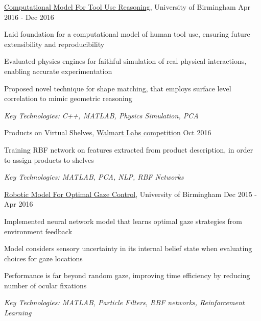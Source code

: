 \documentclass[11pt,article,oneside]{memoir}
\newenvironment{itemize*}{%
  \renewcommand\labelitemi{\textbullet}
  \footnotesize
  \begin{itemize}%
    \setlength{\itemsep}{0pt}}%
  {\end{itemize}
}
\begin{document}
\normalsize
\medskip
\ind \href{https://github.com/iceiony/4ConstraintsTheory/}{Computational Model For Tool Use Reasoning}, University of Birmingham \hfill Apr 2016 - Dec 2016
\begin{itemize*}
  \item Laid foundation for a computational model of human tool use, ensuring future extensibility and reproducibility 
  \item Evaluated physics engines for faithful simulation of real physical interactions, enabling accurate experimentation 
  \item Proposed novel technique for shape matching, that employs surface level correlation to mimic geometric reasoning
\end{itemize*}
\ind \hspace{0.35in} \footnotesize \emph{Key Technologies: C++, MATLAB, Physics Simulation, PCA}

\normalsize
\medskip
\ind Products on Virtual Shelves, \href{https://www.hackerrank.com/walmart-codesprint-ml}{Walmart Labs competition} \hfill Oct 2016
\begin{itemize*}
  \item Training RBF network on features extracted from product description, in order to assign products to shelves
\end{itemize*}
\ind \hspace{0.35in} \footnotesize \emph{Key Technologies: MATLAB, PCA, NLP, RBF Networks}

\normalsize
\medskip
\ind \href{https://github.com/iceiony/gaze-control/}{Robotic Model For Optimal Gaze Control}, University of Birmingham \hfill Dec 2015 - Apr 2016
\begin{itemize*}
  \item Implemented neural network model that learns optimal gaze strategies from environment feedback
  \item Model considers sensory uncertainty in its internal belief state when evaluating choices for gaze locations
  \item Performance is far beyond random gaze, improving time efficiency by reducing number of ocular fixations 
\end{itemize*}
\ind \hspace{0.35in} \footnotesize \emph{Key Technologies: MATLAB, Particle Filters, RBF networks, Reinforcement Learning}


\normalsize
\bigskip
{}
\end{document}
